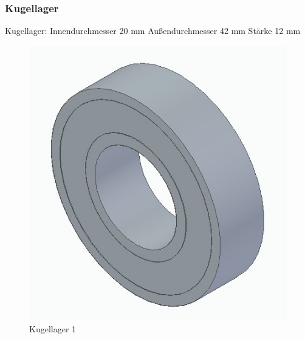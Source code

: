 \newpage

\subsubsection*{Kugellager}

Kugellager: Innendurchmesser 20 mm Außendurchmesser 42 mm Stärke 12 mm
\begin{figure} [H]
	\begin{center}
		\includegraphics[scale=0.3]{figures/mechanik/6004-2RSH-SKF_gr.jpg}
			\caption{Kugellager 1}
			\label{fig:Kugellager 1}
	\end{center}
\end{figure}

